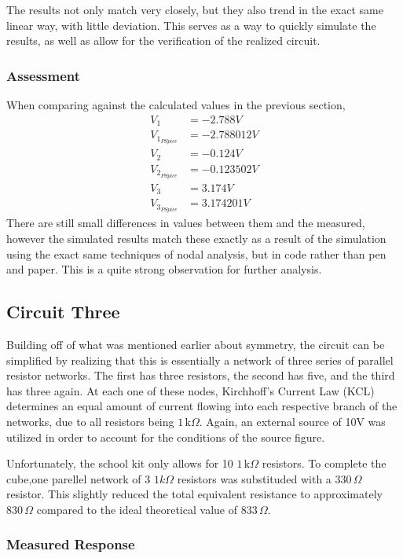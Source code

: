 \documentclass[12pt]{article}
\begin{document}
The results not only match very closely, but they also trend in the exact same
linear way, with little deviation. This serves as a way to quickly
simulate the results, as well as allow for the verification of the realized
circuit.

\subsubsection{Assessment}
When comparing against the calculated values in the previous section,
\begin{align*}
	V_1          & = -2.788V    \\
	V_1_{PSpice} & = -2.788012V \\
	V_2          & = -0.124V    \\
	V_2_{PSpice} & = -0.123502V \\
	V_3          & = 3.174V     \\
	V_3_{PSpice} & = 3.174201V
\end{align*}
There are still small differences in values between them and the measured,
however the simulated results match these exactly as a result of the simulation
using the exact same techniques of nodal analysis, but in code rather than pen
and paper. This is a quite strong observation for further analysis.
\subsection{Circuit Three}

Building off of what was mentioned earlier about symmetry, the circuit can be
simplified by realizing that this is essentially a network of three series of
parallel resistor networks. The first has three resistors, the second has five,
and the third has three again. At each one of these nodes, Kirchhoff's Current
Law (KCL) determines an equal amount of current flowing into each respective
branch of the networks, due to all resistors being $1\,\text{k}\Omega$. Again,
an external source of 10V was utilized in order to account for the conditions of
the source figure.

Unfortunately, the school kit only allows for 10 $1\,\text{k}\Omega$ resistors.
To complete the cube,one parellel network of 3 $1k\Omega$ resistors was
substituded with a $330\,\Omega$ resistor. This slightly reduced the total equivalent resistance to approximately $830\,\Omega$ compared to the ideal theoretical value of $833\,\Omega$.

\subsubsection{Measured Response}
\end{document}
